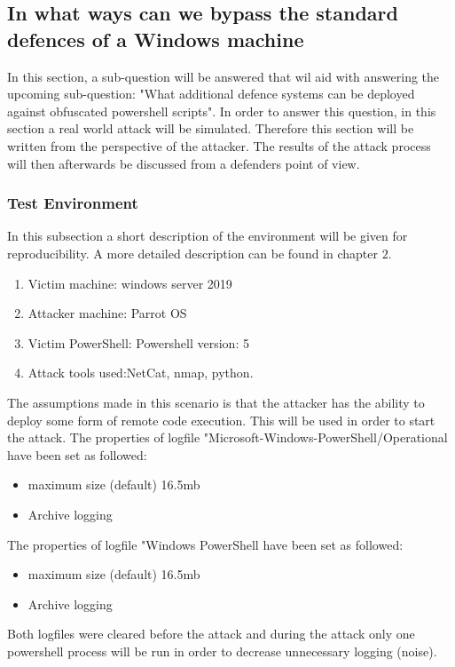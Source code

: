 \documentclass{article}%
\begin{document}
\subsection{In what ways can we bypass the standard defences of a Windows machine}
In this section, a sub-question will be answered that wil aid with answering the upcoming sub-question: "What additional defence systems can be deployed against obfuscated powershell scripts". In order to answer this question, in this section a real world attack will be simulated. Therefore this section will be written from the perspective of the attacker. The results of the attack process will then afterwards be discussed from a defenders point of view.

\subsubsection{Test Environment}
In this subsection a short description of the environment will be given for reproducibility. A more detailed description can be found in chapter $2$.
\begin{enumerate}
	\item Victim machine: windows server 2019
	\item Attacker machine: Parrot OS
	\item Victim PowerShell: Powershell version: 5
	\item Attack tools used:NetCat, nmap, python.
\end{enumerate}
The assumptions made in this scenario is that the attacker has the ability to deploy some form of remote code execution. This will be used in order to start the attack.
The properties of logfile "Microsoft-Windows-PowerShell/Operational have been set as followed:
\begin{itemize}
	\item maximum size (default) 16.5mb
	\item Archive logging
\end{itemize}
The properties of logfile "Windows PowerShell have been set as followed:
\begin{itemize}
	\item maximum size (default) 16.5mb
	\item Archive logging
\end{itemize}
Both logfiles were cleared before the attack and during the attack only one powershell process will be run in order to decrease unnecessary logging (noise).
\end{document}
